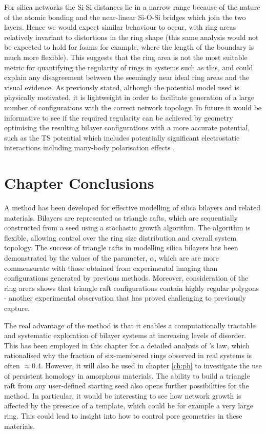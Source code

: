 For silica networks the Si\--Si distances lie in a narrow range because of the nature of the atomic bonding and the near\--linear Si-O-Si bridges
which join the two layers. 
Hence we would expect similar behaviour to occur, with ring areas relatively invariant to distortions in the ring shape (this same analysis would not be expected to hold for foams for example, where the length of the boundary is much more flexible). 
This suggests that the ring area is not the most suitable metric for quantifying the regularity of rings in systems such as this, and could explain any disagreement between the seemingly near ideal ring areas and the visual evidence. 
As previously stated, although the potential model used is physically motivated, it is lightweight in order to facilitate generation of a large number of configurations with the correct network topology. 
In future it would be informative to see if the required regularity can be achieved by geometry optimising the resulting bilayer configurations with a more accurate potential, such as the TS potential which includes potentially significant electrostatic interactions including many-body polarisation effects \cite{Tangney2002}.

\section{Chapter Conclusions}

A method has been developed for effective modelling of silica bilayers and related materials.
Bilayers are represented as triangle rafts, which are sequentially constructed from a seed using a stochastic growth algorithm.
The algorithm is flexible, allowing control over the ring size distribution and overall system topology.
The success of triangle rafts in modelling silica bilayers has been demonstrated by the values of the \aw{} parameter, $\alpha$, which are are more commensurate with those obtained from experimental imaging than configurations generated by previous methods.
Moreover, consideration of the ring areas shows that triangle raft configurations contain highly regular polygons - another experimental observation that has proved challenging to previously capture.

The real advantage of the method is that it enables a computationally tractable and systematic exploration of bilayer systems at increasing levels of disorder.
This has been employed in this chapter for a detailed analysis of \lm's
law, which rationalised why the fraction of six-membered rings observed
in real systems is often $\approx$0.4. 
However, it will also be used in chapter \ref{ch:ph} to investigate the use of persistent homology in amorphous materials.
The ability to build a triangle raft from any user\--defined starting seed also opens further possibilities for the method.
In particular, it would be interesting to see how network growth is affected by the presence of a template, which could be for example a very large ring.
This could lead to insight into how to control pore geometries in these materials.




